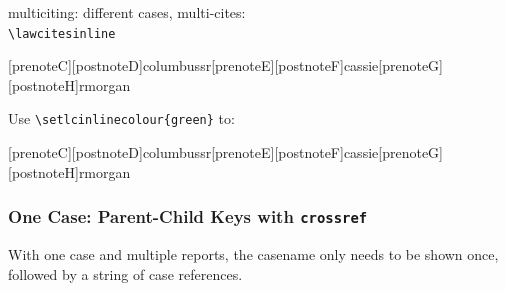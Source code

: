 \noindent
\theball
multiciting: different cases, multi-cites: \\
\verb|\lawcitesinline|
\bigskip

\begin{filecontents}{\democodefile}
[prenoteC][postnoteD]{columbussr}[prenoteE][postnoteF]{cassie}[prenoteG][postnoteH]{rmorgan}
\end{filecontents}
\PrintCodeAndResultsStackedR

Use \verb|\setlcinlinecolour{green}| to:

\begin{filecontents}{\democodefile}
[prenoteC][postnoteD]{columbussr}[prenoteE][postnoteF]{cassie}[prenoteG][postnoteH]{rmorgan}
\end{filecontents}
\PrintCodeAndResultsStackedR
{}

\spotsep

\subsubsection{One Case: Parent-Child Keys with \texttt{crossref}}
With one case and multiple reports, the casename only needs to be shown once, followed by a string of case references.


